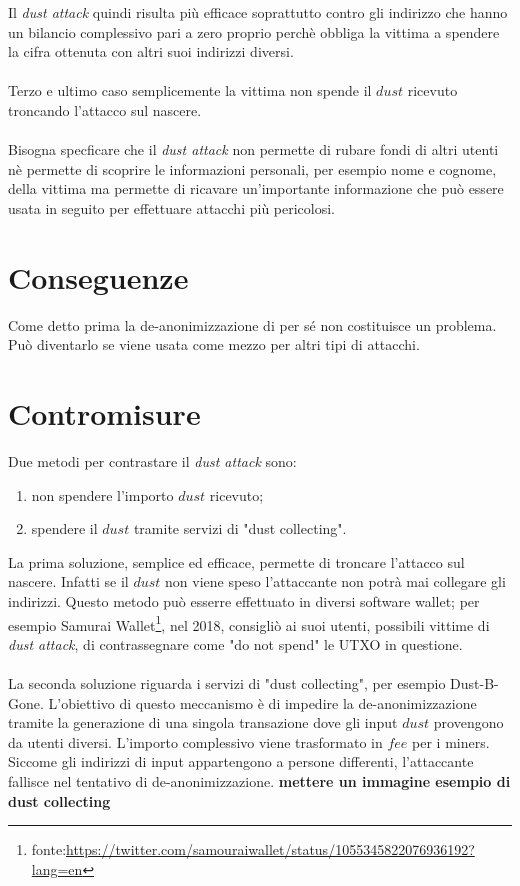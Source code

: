 \FloatBarrier
Il \textit{dust attack} quindi risulta più efficace soprattutto contro gli indirizzo che hanno un bilancio complessivo pari a zero proprio perchè obbliga la vittima a spendere la cifra ottenuta con altri suoi indirizzi diversi.\\\\
Terzo e ultimo caso semplicemente la vittima non spende il $dust$ ricevuto troncando l'attacco sul nascere.\\\\
Bisogna specficare che il \textit{dust attack} non permette di rubare fondi di altri utenti nè permette di scoprire le informazioni personali, per esempio nome e cognome, della vittima ma permette di ricavare un'importante informazione che può essere usata in seguito per effettuare attacchi più pericolosi.

\section{Conseguenze}
Come detto prima la de-anonimizzazione di per sé non costituisce un problema. Può diventarlo se viene usata come mezzo per altri tipi di attacchi. 
\section{Contromisure}
Due metodi per contrastare il \textit{dust attack} sono:
    \begin{enumerate}
        \item non spendere l'importo $dust$ ricevuto; 
        \item spendere il $dust$ tramite servizi di "dust collecting". 
    \end{enumerate}
La prima soluzione, semplice ed efficace, permette di troncare l'attacco sul nascere. Infatti se il $dust$ non viene speso l'attaccante non potrà mai collegare gli indirizzi. 
Questo metodo può esserre effettuato in diversi software wallet; per esempio Samurai Wallet\footnote{fonte:\url{https://twitter.com/samouraiwallet/status/1055345822076936192?lang=en}}, nel 2018, consigliò ai suoi utenti, possibili vittime di \textit{dust attack},  di contrassegnare come "do not spend" le UTXO in questione.\\\\
La seconda soluzione riguarda i servizi di "dust collecting", per esempio Dust-B-Gone\cite{Dbg}.
L'obiettivo di questo meccanismo è di impedire la de-anonimizzazione tramite la generazione di una singola transazione dove gli input $dust$ provengono da utenti diversi. L'importo complessivo viene trasformato in $fee$ per i miners. \\Siccome gli indirizzi di input appartengono a persone differenti, l'attaccante fallisce nel tentativo di de-anonimizzazione.
\textbf{mettere un immagine esempio di dust collecting}